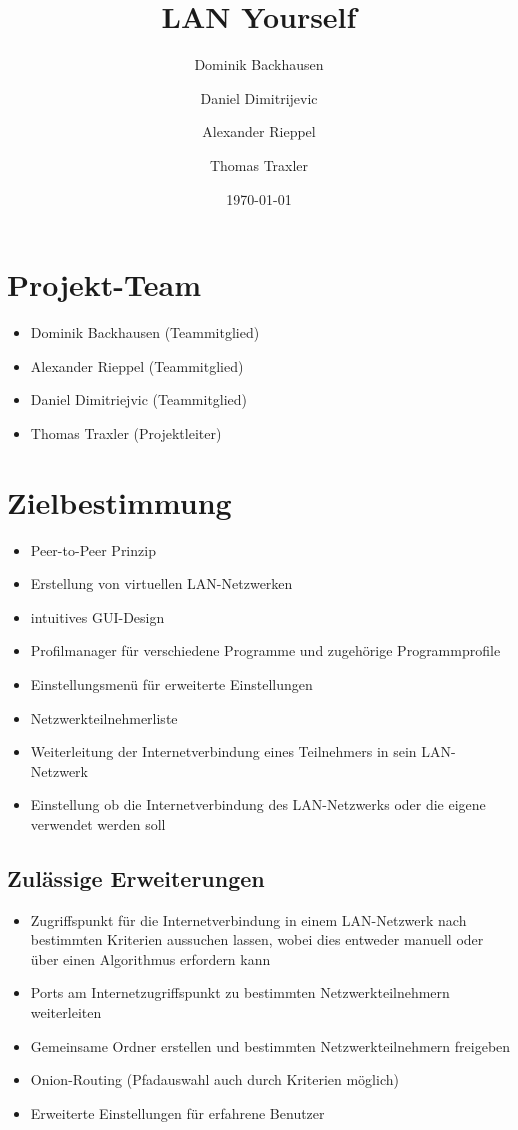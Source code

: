 \documentclass[a4paper,12pt]{scrreprt}
\begin{document}
\author{Dominik Backhausen \and Daniel Dimitrijevic \and Alexander Rieppel \and Thomas Traxler}
\subject{Pflichtenheft}
\title{LAN Yourself}
\date{\today}
\maketitle
\tableofcontents

\chapter{Projekt-Team}
	\begin{itemize}
	\item Dominik Backhausen (Teammitglied)
	\item Alexander Rieppel (Teammitglied)
	\item Daniel Dimitriejvic (Teammitglied)
	\item Thomas Traxler (Projektleiter)
	\end{itemize}
	
	
\chapter{Zielbestimmung}
	\begin{itemize}
	\item Peer-to-Peer Prinzip
	\item Erstellung von virtuellen LAN-Netzwerken
	\item intuitives GUI-Design
	\item Profilmanager für verschiedene Programme und zugehörige Programmprofile
	\item Einstellungsmenü für erweiterte Einstellungen
	\item Netzwerkteilnehmerliste
	\item Weiterleitung der Internetverbindung eines Teilnehmers in sein LAN-Netzwerk
	\item Einstellung ob die Internetverbindung des LAN-Netzwerks oder die eigene verwendet werden soll
	\end{itemize}
	
	\section{Zulässige Erweiterungen}
	
	\begin{itemize}
	\item Zugriffspunkt für die Internetverbindung in einem LAN-Netzwerk nach bestimmten Kriterien aussuchen lassen, wobei dies entweder manuell oder über einen Algorithmus erfordern kann
	\item Ports am Internetzugriffspunkt zu bestimmten Netzwerkteilnehmern weiterleiten
	\item Gemeinsame Ordner erstellen und bestimmten Netzwerkteilnehmern freigeben
	\item Onion-Routing (Pfadauswahl auch durch Kriterien möglich)
	\item Erweiterte Einstellungen für erfahrene Benutzer
	
	\end{itemize}
	
\end{document}
